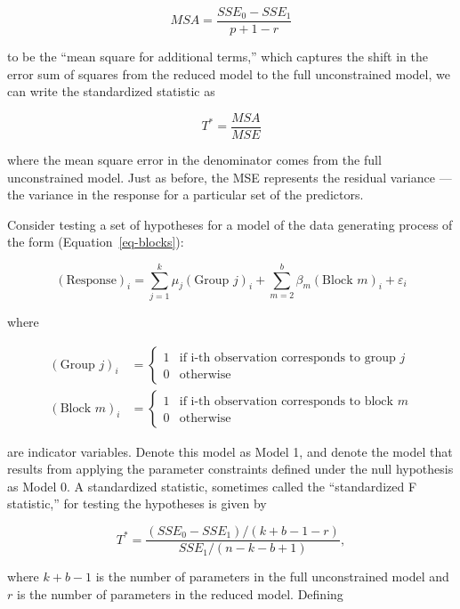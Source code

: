 \documentclass[
  letterpaper,
  DIV=11,
  numbers=noendperiod]{scrreprt}
\providecommand{\tightlist}{%
  \setlength{\itemsep}{0pt}\setlength{\parskip}{0pt}}\usepackage{longtable,booktabs,array}
\theoremstyle{definition}
\theoremstyle{definition}
\theoremstyle{plain}
\theoremstyle{remark}
\begin{document}
\[MSA = \frac{SSE_0 - SSE_1}{p + 1 - r}\]

to be the ``mean square for additional terms,'' which captures the shift
in the error sum of squares from the reduced model to the full
unconstrained model, we can write the standardized statistic as

\[T^* = \frac{MSA}{MSE}\]

where the mean square error in the denominator comes from the full
unconstrained model. Just as before, the MSE represents the residual
variance --- the variance in the response for a particular set of the
predictors.

\begin{description}
\tightlist
\item[Standardized Statistic for Repeated Measures ANOVA
(Definition~\ref{def-blocks-f})]
Consider testing a set of hypotheses for a model of the data generating
process of the form (Equation~\ref{eq-blocks}):
\end{description}

\[(\text{Response})_i = \sum_{j=1}^{k} \mu_j (\text{Group } j)_i + \sum_{m=2}^{b} \beta_m (\text{Block } m)_i + \varepsilon_i\]

where

\[
\begin{aligned}
  (\text{Group } j)_i 
    &= \begin{cases} 1 & \text{if i-th observation corresponds to group } j \\ 0 & \text{otherwise} \end{cases} \\
  (\text{Block } m)_i
    &= \begin{cases} 1 & \text{if i-th observation corresponds to block } m \\ 0 & \text{otherwise} \end{cases}
\end{aligned}
\]

are indicator variables. Denote this model as Model 1, and denote the
model that results from applying the parameter constraints defined under
the null hypothesis as Model 0. A standardized statistic, sometimes
called the ``standardized F statistic,'' for testing the hypotheses is
given by

\[T^* = \frac{\left(SSE_0 - SSE_1\right) / (k + b - 1 - r)}{SSE_1 / (n - k - b + 1)},\]

where \(k + b - 1\) is the number of parameters in the full
unconstrained model and \(r\) is the number of parameters in the reduced
model. Defining
\end{document}
